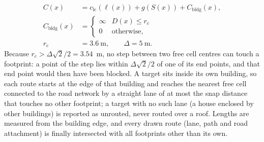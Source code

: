 \documentclass[10pt,a4paper,twocolumn]{article}
\begin{document}
\begin{equation}
\begin{aligned}
C(x)&=c_{\mathrm{lc}}(\ell(x))+g(S(x))+C_{\mathrm{bldg}}(x),\\
C_{\mathrm{bldg}}(x)&=\begin{cases}\infty & D(x)\le r_c\\ 0 & \text{otherwise,}\end{cases}\\
r_c&=3.6\ \mathrm{m},\qquad \Delta=5\ \mathrm{m}.
\end{aligned}
\label{eq:bldg}
\end{equation}
Because $r_c>\Delta\sqrt2/2=3.54$~m, no step between two free cell centres can touch a footprint: a point of the step lies within $\Delta\sqrt2/2$ of one of its end points, and that end point would then have been blocked. A target sits inside its own building, so each route starts at the edge of that building and reaches the nearest free cell connected to the road network by a straight lane of at most the snap distance that touches no other footprint; a target with no such lane (a house enclosed by other buildings) is reported as unrouted, never routed over a roof. Lengths are measured from the building edge, and every drawn route (lane, path and road attachment) is finally intersected with all footprints other than its own.
\end{document}
